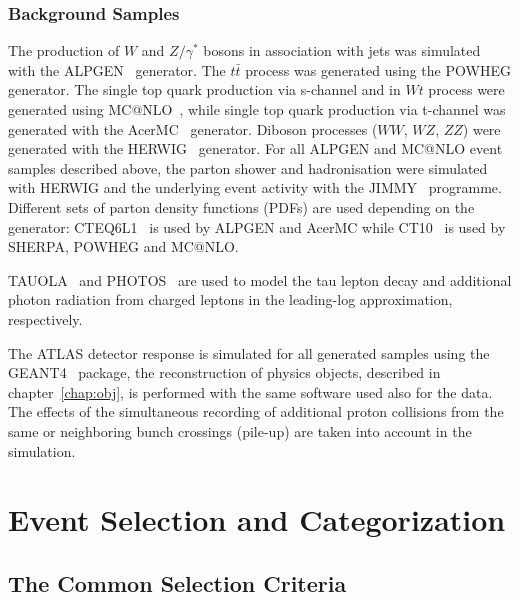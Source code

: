 \subsubsection{Background Samples}
The production of $W$ and $Z/\gamma^*$ bosons in association with jets
was simulated with the ALPGEN~\cite{Alpgen} generator. 
The $t\bar{t}$ process was generated using the POWHEG generator. The single top quark 
production via s-channel and in  $Wt$
process were generated using MC@NLO~\cite{MCatNLO}, while single top quark production via 
t-channel  was generated with the AcerMC~\cite{AcerMC} generator.  Diboson processes ($WW$, $WZ$, $ZZ$) were generated with
the HERWIG~\cite{Herwig} generator.  For all ALPGEN and MC@NLO event samples described
above, the parton shower and hadronisation were simulated with HERWIG
and the underlying event activity with the JIMMY~\cite{JIMMY} programme.
Different sets of parton density functions (PDFs)  are used depending on
the generator: CTEQ6L1~\cite{CTEQ6} is used by ALPGEN and AcerMC while
CT10~\cite{CT10} is used by SHERPA, POWHEG and MC@NLO. 

TAUOLA~\cite{TAUOLA} and PHOTOS~\cite{PHOTOS} are used to model the
tau lepton decay and additional photon radiation from charged leptons
in the leading-log approximation, respectively.

The ATLAS detector response is simulated for all generated samples using the GEANT4~\cite{Geant4,ATLASSIM} package,
the reconstruction of physics objects, described in chapter~\ref{chap:obj}, is performed with the same software used also for 
the data.
The effects of the simultaneous recording of additional proton collisions from the
same or neighboring bunch crossings (pile-up) are taken into account in the
simulation. 



\section{Event Selection and Categorization}\label{sec:selection}


\subsection{The Common Selection Criteria}\label{sec:presel}

